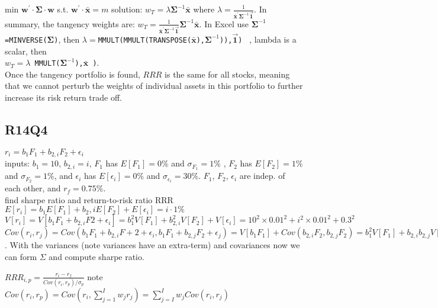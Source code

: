 min $\bm{w}^\prime \cdot \bm{\Sigma} \cdot \bm{w} $  s.t. $\bm{w}^\prime \cdot \bm{\bar{x}} = m  $ solution: $w_T=\lambda \bm{\Sigma}^{-1} \bm{\bar{x}}$ 
where $\lambda = \frac{1}{\bm{\bar{x}^\prime}  \bm{\Sigma}^{-1}  \bm{\vec{1}}} $. 
In summary, the tangency weights are: $w_T=\frac{1}{\bm{\bar{x}^\prime}  \bm{\Sigma}^{-1}  \bm{\vec{1}}} \bm{\Sigma}^{-1} \bm{\bar{x}}$.
In Excel use \texttt{$\bm{\Sigma}^{-1}$=MINVERSE($\bm{\Sigma}$)}, then \texttt{$\lambda=$MMULT(MMULT(TRANSPOSE($\bm{\bar{x}}$),$\bm{\Sigma}^{-1}$)),$\bm{\vec{1}}$)  } , lambda is a scalar, 
then \\
\texttt{$w_T=\lambda$ MMULT($\bm{\Sigma}^{-1}$),$\bm{\bar{x}}$ )}. \\
Once the tangency portfolio is found, $RRR$ is the same for all stocks, meaning that we cannot perturb the weights of individual assets in this portfolio to further increase its risk return trade off.



\subsection*{R14Q4}
$r_i = b_{1} F_1 + b_{2,i} F_2 + \epsilon_i $\\
inputs:
$b_1=10$, $b_{2,i}=i$, 
$F_1$ has $E[F_1]=0\%$ and $\sigma_{F_1}=1\%$ , $F_2$ has  $E[F_2]=1\%$ and $\sigma_{F_2}=1\%$, and $\epsilon_i$ has $E[\epsilon_i]=0\%$ and $\sigma_{\epsilon_i}=30\%$. $F_1$, $F_2$, $\epsilon_i$ are indep. of each other, and $r_f=0.75\%$.\\
find sharpe ratio and return-to-risk ratio RRR \\
$E[r_i] = b_1E[F_1] + b_2,iE[F_2] + E[\epsilon_i]=i \cdot 1\%$ \\

$V [r_i] = V [b_1F_1 + b_{2,i}F2 + \epsilon_i]= b_1^2V[F_1] + b_{2,i}^2V [F_2] + V [\epsilon_i] =  10^2  \times 0.01^2 + i^2  \times 0.01^2 + 0.3^2$ \\
$Cov(r_i,r_j) = Cov(b_1 F_1 + b_{2,i}F+2 + \epsilon_i, b_1 F_1 + b_{2,j} F_2 + \epsilon_j) = V[b_1 F_1] + Cov(b_{2,i}F_2 , b_{2,j} F_2 ) = b_1^2 V[F_1] + b_{2,i}b_{2,j}V[F_2] = 10^2 \times 0.01^2 + i \times j \times 0.01^2 $. With the variances (note variances have an extra-term) and covariances now we can form $\Sigma$ and compute sharpe ratio.

$RRR_{i,p} = \frac{r_i-r_f}{Cov(r_i,r_p)/\sigma_p}$  note $Cov(r_i, r_p) = Cov(r_i,\sum_{j=1}^{I} w_j r_j) = \sum_{j=I}^{I}w_j Cov(r_i, r_j) $ \\

